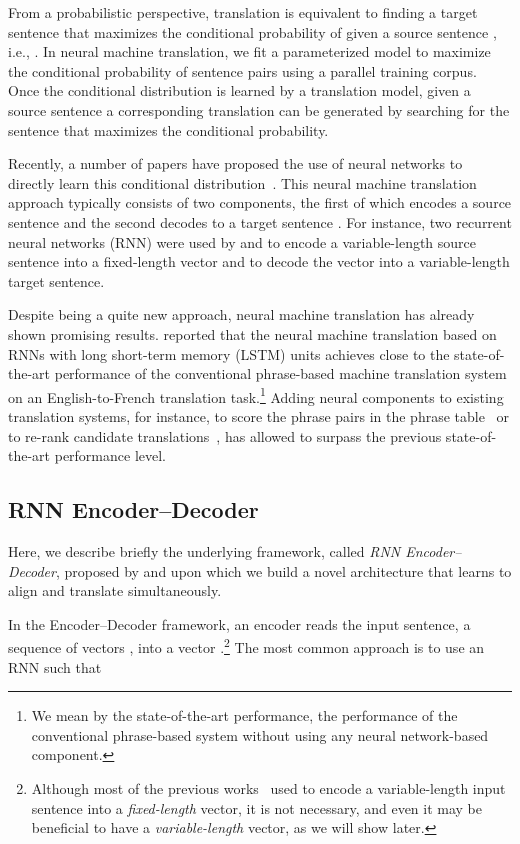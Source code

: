 From a probabilistic perspective, translation is equivalent to finding a target
sentence  that maximizes the conditional probability of  given a
source sentence , i.e., .  In neural
machine translation, we fit a parameterized model to maximize the conditional
probability of sentence pairs using a parallel training corpus. Once the
conditional distribution is learned by a translation model, given a source
sentence a corresponding translation can be generated by searching for the
sentence that maximizes the conditional probability.

Recently, a number of papers have proposed the use of neural networks to
directly learn this conditional distribution~\citep[see,
e.g.,][]{Kalchbrenner2013,Cho2014,Sutskever2014,Cho2014a,Forcada1997}. This
neural machine translation approach typically consists of two components, the
first of which encodes a source sentence  and the second decodes to a
target sentence . For instance, two recurrent neural networks (RNN) were
used by \citep{Cho2014} and \citep{Sutskever2014} to encode a variable-length
source sentence into a fixed-length vector and to decode the vector into a
variable-length target sentence.

Despite being a quite new approach, neural machine translation has already
shown promising results. \citet{Sutskever2014} reported that the neural machine
translation based on RNNs with long short-term memory (LSTM) units achieves
close to the state-of-the-art performance of the conventional phrase-based
machine translation system on an English-to-French translation task.\footnote{
    We mean by the state-of-the-art performance, the performance of the
    conventional phrase-based system without using any neural network-based
    component.
} 
Adding neural components to existing translation systems, for instance,
to score the phrase pairs in the phrase table~\citep{Cho2014} or to re-rank
candidate translations~\citep{Sutskever2014}, has allowed to
surpass the previous state-of-the-art performance level.

\subsection{RNN Encoder--Decoder}

Here, we describe briefly the underlying framework, called {\it RNN
Encoder--Decoder}, proposed by \citet{Cho2014} and \citet{Sutskever2014} upon
which we build a novel architecture that learns to align and translate
simultaneously.

In the Encoder--Decoder framework, an encoder reads the input sentence, a
sequence of vectors , into a vector
.\footnote{
    Although most of the previous works~\citep[see,
    e.g.,][]{Cho2014,Sutskever2014,Kalchbrenner2013} used to encode a
    variable-length input sentence into a {\it fixed-length} vector, it is not
    necessary, and even it may be beneficial to have a {\it variable-length}
    vector, as we will show later.
} The most common approach is to use an RNN such that  

